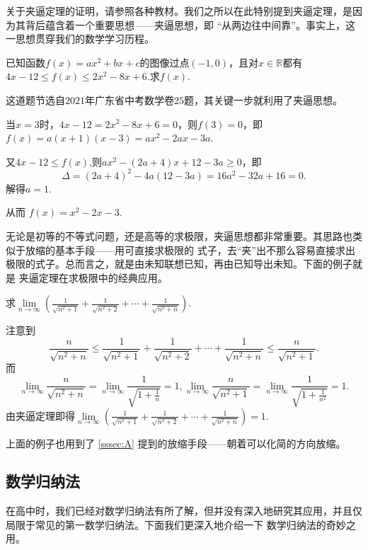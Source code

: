 关于夹逼定理的证明，请参照各种教材。我们之所以在此特别提到夹逼定理，是因为其背后蕴含着一个重要思想——夹逼思想，即
“从两边往中间靠”。事实上，这一思想贯穿我们的数学学习历程。
\begin{example}
    已知函数$f(x)=ax^2+bx+c$的图像过点$(-1,0)$，且对$x\in \mathbb{R}$都有$4x-12\leqslant f(x)\leqslant 2x^2-8x+6$.求$f(x)$.
\end{example}
\begin{solve}
    这道题节选自$2021$年广东省中考数学卷$25$题，其关键一步就利用了夹逼思想。


    当$x=3$时，$4x-12=2x^2-8x+6=0$，则$f(3)=0$，即$f(x)=a(x+1)(x-3)=ax^2-2ax-3a$.


    又$4x-12\leqslant f(x)$,则$ax^2-(2a+4)x+12-3a\geqslant 0$，即
    \[
        \Delta = (2a+4)^2-4a(12-3a)=16a^2-32a+16=0
        .\]
    解得$a=1$.


    从而 $f(x)=x^2-2x-3$.
\end{solve}
无论是初等的不等式问题，还是高等的求极限，夹逼思想都非常重要。其思路也类似于放缩的基本手段——用可直接求极限的
式子，去“夹”出不那么容易直接求出极限的式子。总而言之，就是由未知联想已知，再由已知导出未知。下面的例子就是
夹逼定理在求极限中的经典应用。
\begin{example}
    求$\lim\limits_{n \to \infty}\left( \frac{1}{\sqrt{n^2+1}}+\frac{1}{\sqrt{n^2+2}}+\cdots +\frac{1}{\sqrt{n^2+n}} \right) .$
\end{example}
\begin{solve}
    注意到
    \[
        \frac{n}{\sqrt{n^2+n}}\leqslant \frac{1}{\sqrt{n^2+1}}+\frac{1}{\sqrt{n^2+2}}+\cdots +\frac{1}{\sqrt{n^2+n}}
        \leqslant \frac{n}{\sqrt{n^2+1}}
        .\]
    而
    \[
        \lim\limits_{n \to \infty}\frac{n}{\sqrt{n^2+n}}=\lim\limits_{n \to \infty}\frac{1}{\sqrt{1+\frac{1}{n}}}=1,
        \lim\limits_{n \to \infty}\frac{n}{\sqrt{n^2+1}}=\lim\limits_{n \to \infty}\frac{1}{\sqrt{1+\frac{1}{n^2}}}=1
        .\]
    由夹逼定理即得$\lim\limits_{n \to \infty}\left( \frac{1}{\sqrt{n^2+1}}+\frac{1}{\sqrt{n^2+2}}+\cdots +\frac{1}{\sqrt{n^2+n}} \right) =1$.
\end{solve}
上面的例子也用到了 \autoref{sssec:A} 提到的放缩手段——朝着可以化简的方向放缩。
\subsection{数学归纳法}
在高中时，我们已经对数学归纳法有所了解，但并没有深入地研究其应用，并且仅局限于常见的第一数学归纳法。下面我们更深入地介绍一下
数学归纳法的奇妙之用。

